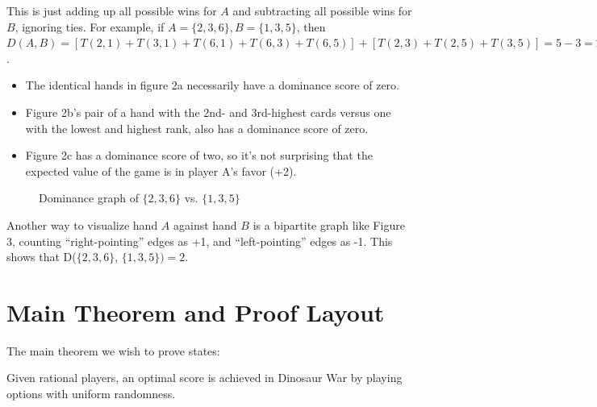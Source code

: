 \documentclass[11pt, oneside]{article} 	%
\begin{document}
This is just adding up all possible wins for $A$ and subtracting all possible wins for $B$, ignoring ties.  For example, if $A = \{2, 3,6\}, B = \{1,3,5\}$, then $D(A,B) = [T(2,1) + T(3,1) + T(6,1) + T(6,3) + T(6,5)] + [T(2,3) + T(2,5) + T(3,5)] = 5 - 3 = 2$.


\begin{itemize}
\item The identical hands in figure 2a necessarily have a dominance score of zero.
\item Figure 2b's pair of a hand with the 2nd- and 3rd-highest cards versus one with the lowest and highest rank, also has a dominance score of zero.
\item Figure 2c has a dominance score of two, so it's not surprising that the expected value of the game is in player A's favor (+2).
\end{itemize}


\begin{figure}
\centering
{}
\label{fig:bipartite}
\caption{Dominance graph of $\{2,3,6\}$ vs. $\{1,3,5\}$}
\end{figure}

Another way to visualize hand $A$ against hand $B$ is a bipartite graph like Figure 3, counting ``right-pointing'' edges as +1, and ``left-pointing'' edges as -1.  This shows that D($\{2,3,6\}$, $\{1,3,5\}) = 2$.


\section{Main Theorem and Proof Layout}

The main theorem we wish to prove states:

\begin{framed}
Given rational players, an optimal score is achieved in Dinosaur War by playing options with uniform randomness.
\end{framed}
\end{document}
